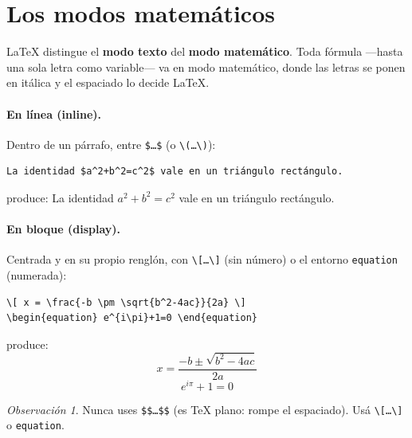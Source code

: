\documentclass[11pt,a4paper]{article}
\theoremstyle{plain}      %
\theoremstyle{definition} %
\theoremstyle{remark}
\newtheorem*{obs}{Observación}
\begin{document}
\section{Los modos matemáticos}
\LaTeX{} distingue el \textbf{modo texto} del \textbf{modo matemático}. Toda
fórmula —hasta una sola letra como variable— va en modo matemático, donde las
letras se ponen en itálica y el espaciado lo decide \LaTeX.

\paragraph{En línea (inline).} Dentro de un párrafo, entre \texttt{\$\dots\$}
(o \texttt{\textbackslash(\dots\textbackslash)}):
\begin{lstlisting}
La identidad $a^2+b^2=c^2$ vale en un triángulo rectángulo.
\end{lstlisting}
produce: La identidad $a^2+b^2=c^2$ vale en un triángulo rectángulo.

\paragraph{En bloque (display).} Centrada y en su propio renglón, con
\texttt{\textbackslash[\dots\textbackslash]} (sin número) o el entorno
\texttt{equation} (numerada):
\begin{lstlisting}
\[ x = \frac{-b \pm \sqrt{b^2-4ac}}{2a} \]
\begin{equation} e^{i\pi}+1=0 \end{equation}
\end{lstlisting}
produce:
\[ x = \frac{-b \pm \sqrt{b^2-4ac}}{2a} \]
\begin{equation}\label{eq:euler} e^{i\pi}+1=0 \end{equation}

\begin{obs}
Nunca uses \texttt{\$\$\dots\$\$} (es \TeX{} plano: rompe el espaciado). Usá
\texttt{\textbackslash[\dots\textbackslash]} o \texttt{equation}.
\end{obs}

\end{document}
